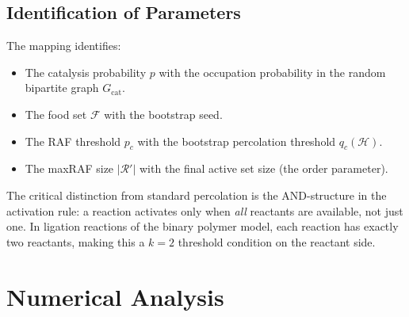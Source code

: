 \documentclass[preprint,12pt]{elsarticle}
\newcommand{\food}{\mathcal{F}}
\begin{document}
\subsection{Identification of Parameters}
\label{sec:parameters}

The mapping identifies:
\begin{itemize}
\item The catalysis probability $p$ with the occupation
probability in the random bipartite graph $G_{\text{cat}}$.
\item The food set $\food$ with the bootstrap seed.
\item The RAF threshold $p_c$ with the bootstrap percolation
threshold $q_c(\mathcal{H})$.
\item The maxRAF size $|\mathcal{R}'|$ with the final active
set size (the order parameter).
\end{itemize}

The critical distinction from standard percolation is the
AND-structure in the activation rule: a reaction activates
only when \emph{all} reactants are available, not just
one. In ligation reactions of the binary polymer model,
each reaction has exactly two reactants, making this a
$k = 2$ threshold condition on the reactant side.

\section{Numerical Analysis}
\label{sec:numerical}

%
%
%
\end{document}
